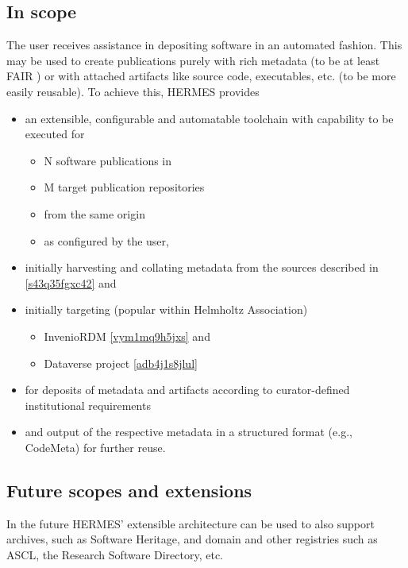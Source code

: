 \documentclass{article}
\begin{document}
\subsection{In scope}\label{ir8q16h2mxws}
The user receives assistance in depositing software in an automated fashion. This may be used to create publications purely with rich metadata (to be at least FAIR \cite{11045035/FNK2BYH3}) or with attached artifacts like source code, executables, etc. (to be more easily reusable). To achieve this, HERMES provides

\begin{itemize}  
\item an extensible, configurable and automatable toolchain with capability to be executed for 

\begin{itemize}  
\item N software publications in 


\item M target publication repositories 


\item from the same origin


\item as configured by the user,


\end{itemize}
\item initially harvesting and collating metadata from the sources described in \ref{s43q35fgxc42} and


\item initially targeting (popular within Helmholtz Association)

\begin{itemize}  
\item InvenioRDM \ref{vym1mq9h5jxs} and


\item Dataverse project \ref{adb4j1s8jlul}


\end{itemize}
\item for deposits of metadata and artifacts according to curator-defined institutional requirements


\item and output of the respective metadata in a structured format (e.g., CodeMeta) for further reuse.


\end{itemize}

\subsection{Future scopes and extensions}\label{owiy885c2loj}
In the future HERMES’ extensible architecture can be used to also support archives, such as Software Heritage, and domain and other registries such as ASCL, the Research Software Directory, etc.
\end{document}
